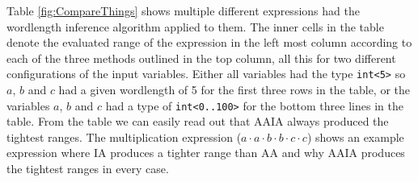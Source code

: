 Table \ref{fig:CompareThings} shows multiple different expressions had the wordlength inference algorithm applied to them. The inner cells in the table denote the evaluated range of the expression in the left most column according to each of the three methods outlined in the top column, all this for two different configurations of the input variables. Either all variables had the type \verb+int<5>+ so $a$, $b$ and $c$ had a given wordlength of 5 for the first three rows in the table, or the variables $a$, $b$ and $c$ had a type of \verb+int<0..100>+ for the bottom three lines in the table. From the table we can easily read out that AAIA always produced the tightest ranges. The multiplication expression ($a \cdot a \cdot b \cdot b \cdot c \cdot c$) shows an example expression where IA produces a tighter range than AA and why AAIA produces the tightest ranges in every case.

